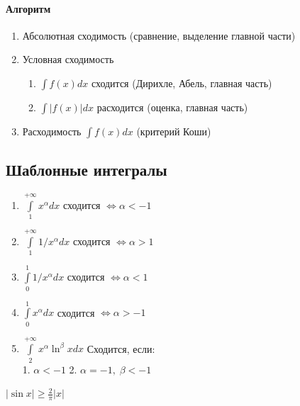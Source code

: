 \documentclass{article}
\begin{document}
\paragraph*{Алгоритм}
\begin{enumerate}
    \item Абсолютная сходимость (сравнение, выделение главной части)
    \item Условная сходимость
          \begin{enumerate}
              \item $ \int f(x)dx $ сходится (Дирихле, Абель, главная часть)
              \item $ \int |f(x)|dx $ расходится (оценка, главная часть)
          \end{enumerate}
    \item Расходимость $ \int f(x) dx  $ (критерий Коши)
\end{enumerate}
\subsection{Шаблонные интегралы}
\begin{multicols}{2}
\begin{enumerate}
    \item $\int\limits_1^{+\infty}x^\alpha dx$ сходится $\Leftrightarrow \alpha < -1 $
    \item $\int\limits_1^{+\infty}1/x^\alpha dx$ сходится $\Leftrightarrow \alpha  > 1$
    \item $ \int\limits_0^1 1/x^\alpha dx $ сходится $\Leftrightarrow \alpha  < 1$
    \item $\int\limits_0^1 x^\alpha dx $ сходится $\Leftrightarrow \alpha > -1 $
    \item $\int\limits_2^{+\infty}x^\alpha \ln^\beta x dx$ Сходится, если: \\
    1. $ \alpha < -1 $ 2. $ \alpha = -1,\; \beta < -1 $
\end{enumerate}
\end{multicols}
$|\sin x|\geq \frac{2}{\pi}|x|$
\end{document}
